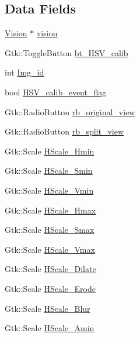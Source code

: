 \subsection*{Data Fields}
\begin{DoxyCompactItemize}
\item 
\hyperlink{class_vision}{Vision} $\ast$ \hyperlink{class_vision_g_u_i_a36aba058af844ec6cbe0c945c616cd5f}{vision}
\item 
Gtk\+::\+Toggle\+Button \hyperlink{class_vision_g_u_i_a9506af83c1ee97d1b4f32b3fbb53fc48}{bt\+\_\+\+H\+S\+V\+\_\+calib}
\item 
int \hyperlink{class_vision_g_u_i_a4a46f114bc58e0f1d56b655f4bc8f9d8}{Img\+\_\+id}
\item 
bool \hyperlink{class_vision_g_u_i_ac732afeda7552e0c1dc4db8d63633be2}{H\+S\+V\+\_\+calib\+\_\+event\+\_\+flag}
\item 
Gtk\+::\+Radio\+Button \hyperlink{class_vision_g_u_i_abb4ca4d613412da2ce06c55a8a37a7f2}{rb\+\_\+original\+\_\+view}
\item 
Gtk\+::\+Radio\+Button \hyperlink{class_vision_g_u_i_a7fec73756125a9e179f91cde80658897}{rb\+\_\+split\+\_\+view}
\item 
Gtk\+::\+Scale \hyperlink{class_vision_g_u_i_a8cc0de8ce9ca9c05d1c47176b724ecc3}{H\+Scale\+\_\+\+Hmin}
\item 
Gtk\+::\+Scale \hyperlink{class_vision_g_u_i_a23eb7af1cc6d3a055892de4704b48126}{H\+Scale\+\_\+\+Smin}
\item 
Gtk\+::\+Scale \hyperlink{class_vision_g_u_i_a8a1e7f6d4357eceab8e47fe0fb523cf9}{H\+Scale\+\_\+\+Vmin}
\item 
Gtk\+::\+Scale \hyperlink{class_vision_g_u_i_a0b1bb9b8a70bd1f93427f71d0e885313}{H\+Scale\+\_\+\+Hmax}
\item 
Gtk\+::\+Scale \hyperlink{class_vision_g_u_i_a147e8499bd7412fdb732103c0754f013}{H\+Scale\+\_\+\+Smax}
\item 
Gtk\+::\+Scale \hyperlink{class_vision_g_u_i_ab277d08dcce9e2521b9d4c542be69247}{H\+Scale\+\_\+\+Vmax}
\item 
Gtk\+::\+Scale \hyperlink{class_vision_g_u_i_a6a7c757a11a2699e841b6b49fe18d1de}{H\+Scale\+\_\+\+Dilate}
\item 
Gtk\+::\+Scale \hyperlink{class_vision_g_u_i_ad4bc77416f4e50fa03a7cc7f64a2d78e}{H\+Scale\+\_\+\+Erode}
\item 
Gtk\+::\+Scale \hyperlink{class_vision_g_u_i_a88fa2852521012287ae804404280c57f}{H\+Scale\+\_\+\+Blur}
\item 
Gtk\+::\+Scale \hyperlink{class_vision_g_u_i_a72d3a4fe84821ceafeb4293f196aacd7}{H\+Scale\+\_\+\+Amin}

\end{DoxyCompactItemize}
